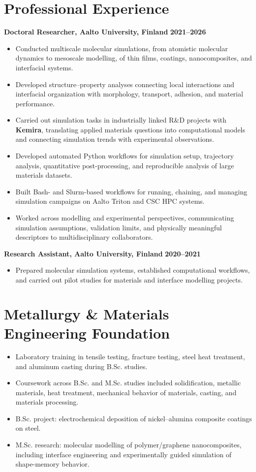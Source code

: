 \documentclass[a4paper,10pt]{article}
\begin{document}
\section{Professional Experience}

\textbf{Doctoral Researcher, Aalto University, Finland} \hfill \textbf{2021--2026}
\begin{itemize}
    \item Conducted multiscale molecular simulations, from atomistic molecular dynamics to mesoscale modelling, of thin films, coatings, nanocomposites, and interfacial systems.
    \item Developed structure--property analyses connecting local interactions and interfacial organization with morphology, transport, adhesion, and material performance.
    \item Carried out simulation tasks in industrially linked R\&D projects with \textbf{Kemira}, translating applied materials questions into computational models and connecting simulation trends with experimental observations.
    \item Developed automated Python workflows for simulation setup, trajectory analysis, quantitative post-processing, and reproducible analysis of large materials datasets.
    \item Built Bash- and Slurm-based workflows for running, chaining, and managing simulation campaigns on Aalto Triton and CSC HPC systems.
    \item Worked across modelling and experimental perspectives, communicating simulation assumptions, validation limits, and physically meaningful descriptors to multidisciplinary collaborators.
\end{itemize}

\textbf{Research Assistant, Aalto University, Finland} \hfill \textbf{2020--2021}
\begin{itemize}
    \item Prepared molecular simulation systems, established computational workflows, and carried out pilot studies for materials and interface modelling projects.
\end{itemize}


\section{Metallurgy \& Materials Engineering Foundation}
\begin{itemize}
    \item Laboratory training in tensile testing, fracture testing, steel heat treatment, and aluminum casting during B.Sc. studies.
    \item Coursework across B.Sc. and M.Sc. studies included solidification, metallic materials, heat treatment, mechanical behavior of materials, casting, and materials processing.
    \item B.Sc. project: electrochemical deposition of nickel--alumina composite coatings on steel.
    \item M.Sc. research: molecular modelling of polymer/graphene nanocomposites, including interface engineering and experimentally guided simulation of shape-memory behavior.
\end{itemize}
\end{document}
